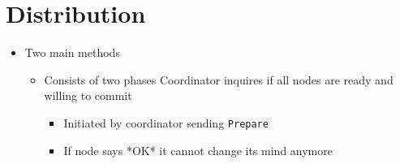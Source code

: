 
\section{Distribution}
\begin{itemize}
        \begin{itemize}
             Multiple DBs and a single coordinator which manages them
                \begin{itemize}
                    \item Atomcity of a single nodes does not imply atomcity in a distributed setting
                \end{itemize}
            \item Two main methods
                \begin{itemize}
                    \item Consists of two phases
                     Coordinator inquires if all nodes are ready and willing to commit
                        \begin{itemize}
                            \item Initiated by coordinator sending \verb+Prepare+
                            \item If node says *OK* it cannot change its mind anymore
                        \end{itemize}


\end{itemize}
\end{itemize}
\end{itemize}
